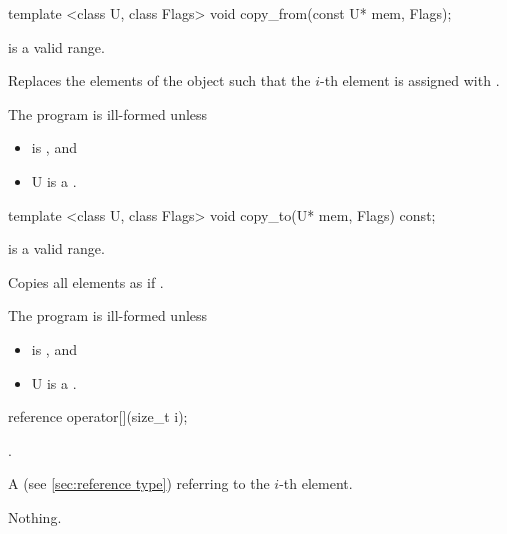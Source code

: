 \begin{itemdecl}
template <class U, class Flags> void copy_from(const U* mem, Flags);
\end{itemdecl}
\begin{itemdescr}
  \code{[mem, mem + size())} is a valid range.

  \pnum\effects Replaces the elements of the \simd object such that the $i$-th element is assigned with  \foralli.

  \pnum\remarks The program is ill-formed unless
  \begin{itemize}
      \item {} is \true, and
      \item \type U is a \realArithmeticType.
  \end{itemize}
\end{itemdescr}

\begin{itemdecl}
template <class U, class Flags> void copy_to(U* mem, Flags) const;
\end{itemdecl}
\begin{itemdescr}
  \code{[mem, mem + size())} is a valid range.

  \pnum\effects Copies all \simd elements as if  \foralli.

  \pnum\remarks The program is ill-formed unless
  \begin{itemize}
      \item {} is \true, and
      \item \type U is a \realArithmeticType.
  \end{itemize}
\end{itemdescr}

\newcommand\simdElementReference[1]{
  \pnum\requires \code{i < size()}.

  \pnum\returns A \code{reference} (see \ref{sec:reference type}) referring to the $i$-th element.
%

  \pnum\throws Nothing.
}
\begin{itemdecl}
reference operator[](size_t i);
\end{itemdecl}
\begin{itemdescr}
  \simdElementReference{\simd{}}
\end{itemdescr}

